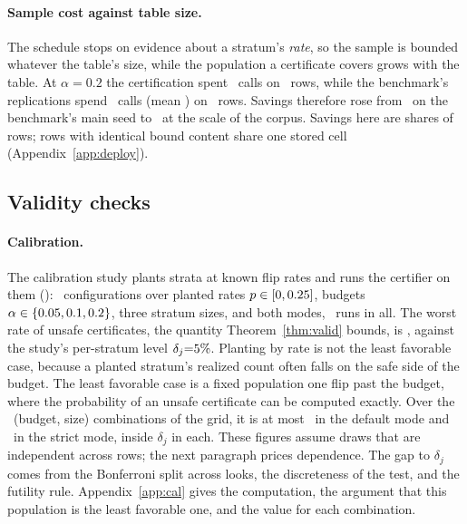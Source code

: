 \keeprunin
\paragraph{Sample cost against table size.} The schedule stops on
evidence about a stratum's \emph{rate}, so the sample is bounded
whatever the table's size, while the population a certificate covers
grows with the table. At
$\alpha{=}0.2$ the certification spent \deployOracle\ calls on
\deployN\ rows, while the benchmark's replications spend
\benchOracleRange\ calls (mean \benchOracleMean) on \benchN\ rows.
Savings therefore rose from \benchSavingsMain\ on the benchmark's main
seed to \deploySavings\ at the scale of the corpus. Savings here are
shares of rows; rows with identical bound content share one stored cell
(Appendix~\ref{app:deploy}).

\keepheading
\subsection{Validity checks}
\label{sec:exp-validity}

\keeprunin
\paragraph{Calibration.} The calibration study plants strata at
known flip rates and runs the certifier on them ():
\calConfigs\ configurations over planted rates $p \in [0, 0.25]$,
budgets $\alpha \in \{0.05, 0.1, 0.2\}$, three stratum sizes, and both
modes, \calTrials\ runs in all. The worst rate of unsafe certificates,
the quantity Theorem~\ref{thm:valid} bounds, is \calUnsafeWorst, against
the study's per-stratum level $\delta_j{=}5\%$. Planting by
rate is not the least favorable case, because a planted stratum's
realized count often falls on the safe side of the budget. The least
favorable case is a fixed population one flip past the budget, where the
probability of an unsafe certificate can be computed exactly. Over the
\calBoundaryCells\ (budget, size) combinations of the grid, it is at most
\calBoundaryHi\ in the default mode and \calBoundaryStrictHi\ in the
strict mode, inside $\delta_j$ in each. These figures assume draws that
are independent across rows; the next paragraph prices dependence. The
gap to $\delta_j$ comes from the Bonferroni split across looks, the
discreteness of the test, and the futility rule. Appendix~\ref{app:cal}
gives the computation, the argument that this population is the least
favorable one, and the value for each combination.

